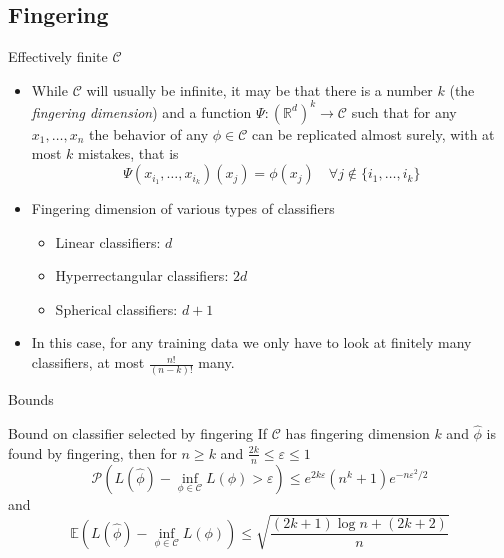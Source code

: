 \documentclass{beamer}
\renewcommand{\Pr}[1]{\mathcal{P} \left( #1 \right)}
\newcommand{\cls}{\mathcal{C}}
\newcommand{\E}[1]{\mathbb{E}\left( #1 \right)}
\newcommand{\R}{\mathbb{R}}
\newcommand{\eps}{\varepsilon}
\begin{document}
\subsection{Fingering}
\begin{frame}{Effectively finite $\cls$}
\begin{itemize}
\item While $\cls$ will usually be infinite, it may be that there is a number $k$ (the \emph{fingering dimension}) and a function $\Psi: (\R^d)^k \to \cls$ such that for any $x_1,\ldots,x_n$ the behavior of any $\phi \in \cls$ can be replicated almost surely, with at most $k$ mistakes, that is
\[ \Psi(x_{i_1}, \ldots, x_{i_k})(x_j) = \phi(x_j) \quad \forall j \not\in \{i_1,\ldots,i_k\} \]
\item Fingering dimension of various types of classifiers
\begin{itemize}
\item Linear classifiers: $d$
\item Hyperrectangular classifiers: $2d$
\item Spherical classifiers: $d+1$
\end{itemize}
\item In this case, for any training data we only have to look at finitely many classifiers, at most $\frac{n!}{(n-k)!}$ many.
\end{itemize}
\end{frame}

\begin{frame}{Bounds}
\begin{block}{Bound on classifier selected by fingering}
If $\cls$ has fingering dimension $k$ and $\hat\phi$ is found by fingering, then for $n \geq k$ and $\frac{2k}n \leq \eps \leq 1$
\[ \Pr{ L(\hat\phi) - \inf_{\phi \in \cls} L(\phi) > \eps} \leq e^{2k\eps}(n^k + 1)e^{-n\eps^2/2} \]
and
\[ \E{ L(\hat\phi) - \inf_{\phi \in \cls} L(\phi)} \leq \sqrt{\frac{(2k+1)\log n + (2k+2)}n}\]
\end{block}
\end{frame}
\end{document}
